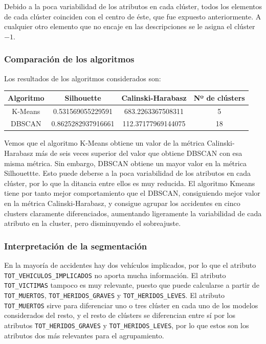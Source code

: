 \documentclass[a4]{article}
\begin{document}
Debido a la poca variabilidad de los atributos en cada clúster, todos los elementos de cada clúster coinciden con el centro de éste, que fue expuesto anteriormente. A cualquier otro elemento que no encaje en las descripciones se le asigna el clúster $-1$.

\subsubsection{Comparación de los algoritmos}

Los resultados de los algoritmos considerados son:

\begin{center}
\begin{tabular}{|c|c|c|c|}
\hline
  \multicolumn{1}{|c|}{\textbf{Algoritmo}} & \textbf{Silhouette} & \textbf{Calinski-Harabasz} &  \textbf{Nº de clústers}\\ \hline
  K-Means & 0.531569055229591   & 683.2263367508311  & 5  \\ \hline
  DBSCAN  & 0.8625282937916661  & 112.37177969144075 & 18 \\ \hline
\end{tabular}
\end{center}

Vemos que el algoritmo K-Means obtiene un valor de la métrica Calinski-Harabasz más de seis veces superior del valor que obtiene DBSCAN con esa misma métrica. Sin embargo, DBSCAN obtiene un mayor valor en la métrica Silhouettte. Esto puede deberse a la poca variabilidad de los atributos en cada clúster, por lo que la ditancia entre ellos es muy reducida. El algoritmo Kmeans tiene por tanto mejor comportamiento que el DBSCAN, consiguiendo mejor valor en la métrica Calinski-Harabasz, y consigue agrupar los accidentes en cinco clusters claramente diferenciados, aumentando ligeramente la variabilidad de cada atributo en la cluster, pero disminuyendo el sobreajuste.

\subsubsection{Interpretación de la segmentación}

En la mayoría de accidentes hay dos vehículos implicados, por lo que el atributo \texttt{TOT\_VEHICULOS\_IMPLICADOS} no aporta mucha información. El atributo \texttt{TOT\_VICTIMAS} tampoco es muy relevante, puesto que puede calcularse a partir de \texttt{TOT\_MUERTOS}, \texttt{TOT\_HERIDOS\_GRAVES} y \texttt{TOT\_HERIDOS\_LEVES}. El atributo \texttt{TOT\_MUERTOS} sirve para diferenciar uno o tres clúster en cada uno de los modelos considerados del resto, y el resto de clústers se diferencian entre sí por los atributos \texttt{TOT\_HERIDOS\_GRAVES} y \texttt{TOT\_HERIDOS\_LEVES}, por lo que estos son los atributos dos más relevantes para el agrupamiento.
\end{document}
